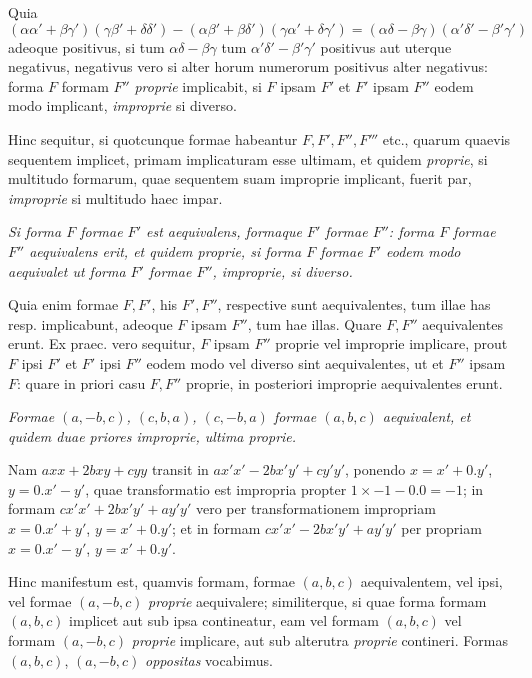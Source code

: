 Quia
\[
(\alpha\alpha'+\beta\gamma')(\gamma\beta'+\delta\delta')
 -(\alpha\beta'+\beta\delta')(\gamma\alpha'+\delta\gamma')
 =(\alpha\delta-\beta\gamma)(\alpha'\delta'-\beta'\gamma')
\]
adeoque positivus, si tum \(\alpha\delta-\beta\gamma\) tum \(\alpha'\delta'-\beta'\gamma'\) positivus aut uterque negativus, negativus vero si alter horum numerorum positivus alter negativus: forma \(F\) formam \(F''\) \textit{proprie} implicabit, si \(F\) ipsam \(F'\) et \(F'\) ipsam \(F''\) eodem modo implicant, \textit{improprie} si diverso.

Hinc sequitur, si quotcunque formae habeantur \(F,F',F'',F'''\) etc., quarum quaevis sequentem implicet, primam implicaturam esse ultimam, et quidem \textit{proprie}, si multitudo formarum, quae sequentem suam improprie implicant, fuerit par, \textit{improprie} si multitudo haec impar.

\textit{Si forma \(F\) formae \(F'\) est aequivalens, formaque \(F'\) formae \(F''\): forma \(F\) formae \(F''\) aequivalens erit, et quidem proprie, si forma \(F\) formae \(F'\) eodem modo aequivalet ut forma \(F'\) formae \(F''\), improprie, si diverso.}

Quia enim formae \(F,F'\), his \(F',F''\), respective sunt aequivalentes, tum illae has resp. implicabunt, adeoque \(F\) ipsam \(F''\), tum hae illas. Quare \(F,F''\) aequivalentes erunt. Ex praec. vero sequitur, \(F\) ipsam \(F''\) proprie vel improprie implicare, prout \(F\) ipsi \(F'\) et \(F'\) ipsi \(F''\) eodem modo vel diverso sint aequivalentes, ut et \(F''\) ipsam \(F\): quare in priori casu \(F,F''\) proprie, in posteriori improprie aequivalentes erunt.

\textit{Formae \((a,-b,c)\), \((c,b,a)\), \((c,-b,a)\) formae \((a,b,c)\) aequivalent, et quidem duae priores improprie, ultima proprie.}

Nam \(axx+2bxy+cyy\) transit in \(ax'x'-2bx'y'+cy'y'\), ponendo \(x=x'+0.y'\), \(y=0.x'-y'\), quae transformatio est impropria propter \(1\times-1-0.0=-1\); in formam \(cx'x'+2bx'y'+ay'y'\) vero per transformationem impropriam \(x=0.x'+y'\), \(y=x'+0.y'\); et in formam \(cx'x'-2bx'y'+ay'y'\) per propriam \(x=0.x'-y'\), \(y=x'+0.y'\).

Hinc manifestum est, quamvis formam, formae \((a,b,c)\) aequivalentem, vel ipsi, vel formae \((a,-b,c)\) \textit{proprie} aequivalere; similiterque, si quae forma formam \((a,b,c)\) implicet aut sub ipsa contineatur, eam vel formam \((a,b,c)\) vel formam \((a,-b,c)\) \textit{proprie} implicare, aut sub alterutra \textit{proprie} contineri. Formas \((a,b,c)\), \((a,-b,c)\) \textit{oppositas} vocabimus.

